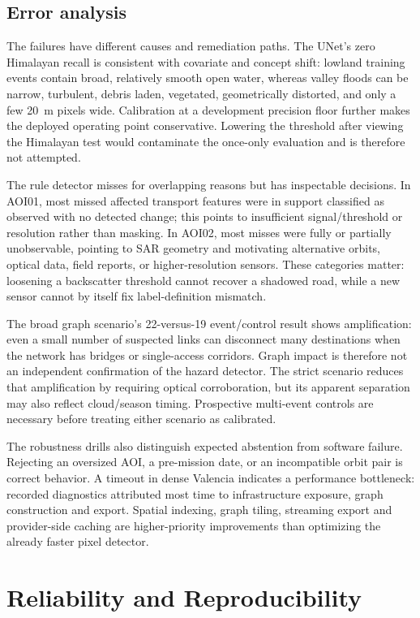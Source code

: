 \documentclass[10pt,twocolumn,letterpaper]{article}
\begin{document}
\subsection{Error analysis}
The failures have different causes and remediation paths. The UNet's zero
Himalayan recall is consistent with covariate and concept shift: lowland training
events contain broad, relatively smooth open water, whereas valley floods can be
narrow, turbulent, debris laden, vegetated, geometrically distorted, and only a
few 20~m pixels wide. Calibration at a development precision floor further makes
the deployed operating point conservative. Lowering the threshold after viewing
the Himalayan test would contaminate the once-only evaluation and is therefore
not attempted.

The rule detector misses for overlapping reasons but has inspectable decisions.
In AOI01, most missed affected transport features were in support classified as
observed with no detected change; this points to insufficient signal/threshold or
resolution rather than masking. In AOI02, most misses were fully or partially
unobservable, pointing to SAR geometry and motivating alternative orbits, optical
data, field reports, or higher-resolution sensors. These categories matter:
loosening a backscatter threshold cannot recover a shadowed road, while a new
sensor cannot by itself fix label-definition mismatch.

The broad graph scenario's 22-versus-19 event/control result shows amplification:
even a small number of suspected links can disconnect many destinations when the
network has bridges or single-access corridors. Graph impact is therefore not an
independent confirmation of the hazard detector. The strict scenario reduces
that amplification by requiring optical corroboration, but its apparent
separation may also reflect cloud/season timing. Prospective multi-event controls
are necessary before treating either scenario as calibrated.

The robustness drills also distinguish expected abstention from software failure.
Rejecting an oversized AOI, a pre-mission date, or an incompatible orbit pair is
correct behavior. A timeout in dense Valencia indicates a performance bottleneck:
recorded diagnostics attributed most time to infrastructure exposure, graph
construction and export. Spatial indexing, graph tiling, streaming export and
provider-side caching are higher-priority improvements than optimizing the
already faster pixel detector.

\section{Reliability and Reproducibility}
\end{document}
